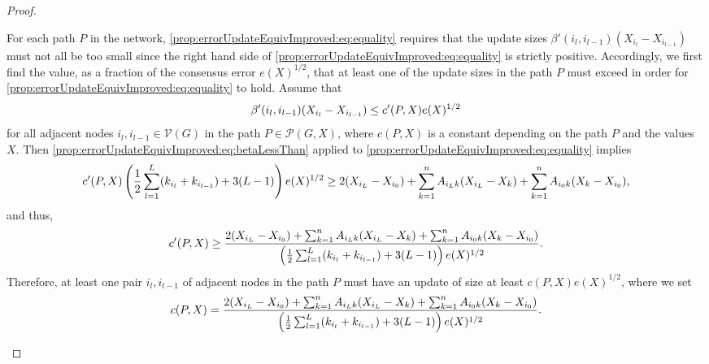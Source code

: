 \documentclass{article}
\theoremstyle{remark}
\begin{document}
\begin{proof}
\begin{enumerate}
			For each path $P$ in the network, \eqref{prop:errorUpdateEquivImproved:eq:equality} requires that the update sizes $\beta'(i_l,i_{l-1})(X_{i_l}-X_{i_{l-1}})$ must not all be too small since the right hand side of \eqref{prop:errorUpdateEquivImproved:eq:equality} is strictly positive.  Accordingly, we first find the value, as a fraction of the consensus error $e(X)^{1/2}$, that at least one of the update sizes in the path $P$ must exceed in order for \eqref{prop:errorUpdateEquivImproved:eq:equality} to hold. Assume that 
			\begin{equation}{\label{prop:errorUpdateEquivImproved:eq:betaLessThan}}
				\beta'(i_l,i_{l-1})(X_{i_{l}}-X_{i_{l-1}})\leq c'(P,X)e(X)^{1/2}
			\end{equation}
			for all adjacent nodes $i_l,i_{l-1}\in\mathcal{V}(G)$ in the path $P\in\mathcal{P}(G,X)$, where $c(P,X)$ is a constant depending on the path $P$ and the values $X$. Then \eqref{prop:errorUpdateEquivImproved:eq:betaLessThan} applied to \eqref{prop:errorUpdateEquivImproved:eq:equality} implies
			\begin{equation}{\label{prop:errorUpdateEquivImproved:eq:5}}
			c'(P,X)\left(\frac{1}{2}\sum_{l=1}^L(k_{i_l}+k_{i_{l-1}})+3(L-1)\right)e(X)^{1/2}\geq 2(X_{i_L}-X_{i_0}) + \sum_{k=1}^nA_{i_Lk}(X_{i_L}-X_k) + \sum_{k=1}^nA_{i_0k}(X_k-X_{i_0}),
			\end{equation}
			and thus,
			\begin{equation}{\label{prop:errorUpdateEquivImproved:eq:6}}
			c'(P,X) \geq \frac{2(X_{i_L}-X_{i_0}) + \sum_{k=1}^nA_{i_Lk}(X_{i_L}-X_k) + \sum_{k=1}^nA_{i_0k}(X_k-X_{i_0})}{\left(\frac{1}{2}\sum_{l=1}^L(k_{i_l}+k_{i_{l-1}})+3(L-1)\right)e(X)^{1/2}}.
			\end{equation}
			Therefore, at least one pair $i_{l},i_{l-1}$ of adjacent nodes in the path $P$ must have an update of size at least $c(P,X)e(X)^{1/2}$, where we set
			\begin{equation}{\label{prop:errorUpdateEquivImproved:eq:7}}
			c(P,X) = \frac{2(X_{i_L}-X_{i_0}) + \sum_{k=1}^nA_{i_Lk}(X_{i_L}-X_k) + \sum_{k=1}^nA_{i_0k}(X_k-X_{i_0})}{\left(\frac{1}{2}\sum_{l=1}^L(k_{i_l}+k_{i_{l-1}})+3(L-1)\right)e(X)^{1/2}}.
			\end{equation}
	\end{enumerate}
\end{proof}
\end{document}
